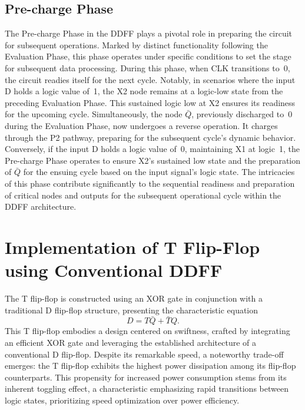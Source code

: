 \documentclass[conference]{IEEEtran}
\begin{document}
\subsection{Pre-charge Phase}

The Pre-charge Phase in the DDFF plays a pivotal role in preparing the circuit for subsequent operations. Marked by distinct functionality following the Evaluation Phase, this phase operates under specific conditions to set the stage for subsequent data processing. During this phase, when CLK transitions to~0, the circuit readies itself for the next cycle. Notably, in scenarios where the input D holds a logic value of~1, the X2 node remains at a logic-low state from the preceding Evaluation Phase. This sustained logic low at X2 ensures its readiness for the upcoming cycle. Simultaneously, the node $\bar{Q}$, previously discharged to~0 during the Evaluation Phase, now undergoes a reverse operation. It charges through the P2 pathway, preparing for the subsequent cycle's dynamic behavior. Conversely, if the input D holds a logic value of~0, maintaining X1 at logic~1, the Pre-charge Phase operates to ensure X2's sustained low state and the preparation of $\bar{Q}$ for the ensuing cycle based on the input signal's logic state. The intricacies of this phase contribute significantly to the sequential readiness and preparation of critical nodes and outputs for the subsequent operational cycle within the DDFF architecture.

\section{Implementation of T Flip-Flop using Conventional DDFF}

The T flip-flop is constructed using an XOR gate in conjunction with a traditional D flip-flop structure, presenting the characteristic equation
\begin{equation}
D = T\bar{Q} + \bar{T}Q.
\end{equation}
This T flip-flop embodies a design centered on swiftness, crafted by integrating an efficient XOR gate and leveraging the established architecture of a conventional D flip-flop. Despite its remarkable speed, a noteworthy trade-off emerges: the T flip-flop exhibits the highest power dissipation among its flip-flop counterparts. This propensity for increased power consumption stems from its inherent toggling effect, a characteristic emphasizing rapid transitions between logic states, prioritizing speed optimization over power efficiency.
\end{document}

